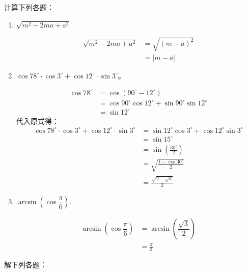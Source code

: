 \documentclass[answers]{exam}
\begin{document}
\begin{questions}
\begin{enumerate}[label=(\arabic*)]
	\end{enumerate}

	\question 计算下列各题：
	\begin{enumerate}[label=(\arabic*)]
		\item $\sqrt{m^2 - 2ma + a^2} $
		      \begin{solution}
			      \begin{align*}
				      \sqrt{m^2 - 2ma + a^2} & = \sqrt{(m-a)^2} \\
				                             & = |m-a|
			      \end{align*}
		      \end{solution}
		\item $\cos78^\circ\cdot\cos3^\circ + \cos12^\circ\cdot\sin3^\circ$。
		      \begin{solution}
			      \begin{align*}
				      \cos78^\circ & = \cos(90^\circ - 12^\circ)                           \\
				                   & = \cos90^\circ\cos12^\circ + \sin90^\circ\sin12^\circ \\
				                   & = \sin12^\circ
			      \end{align*}
			      代入原式得：
			      \begin{align*}
				      \cos78^\circ\cdot\cos3^\circ + \cos12^\circ\cdot\sin3^\circ
				       & = \sin12^\circ\cos3^\circ + \cos12^\circ\sin3^\circ \\
				       & = \sin15^\circ                                      \\
				       & = \sin\left(\frac{30^\circ}{2}\right)               \\
				       & = \sqrt{\frac{1-\cos30^\circ}{2}}                   \\
				       & = \frac{\sqrt{2-\sqrt{3}}}{2}
			      \end{align*}
		      \end{solution}
		\item $\arcsin\left(\cos\dfrac\pi6\right)$.
		      \begin{solution}
			      \begin{align*}
				      \arcsin\left(\cos\dfrac\pi6\right) & = \arcsin(\dfrac{\sqrt{3}}2) \\
				                                         & = \frac{\pi}{3}
			      \end{align*}
		      \end{solution}
	\end{enumerate}
	\question 解下列各题：

\end{questions}
\end{document}
